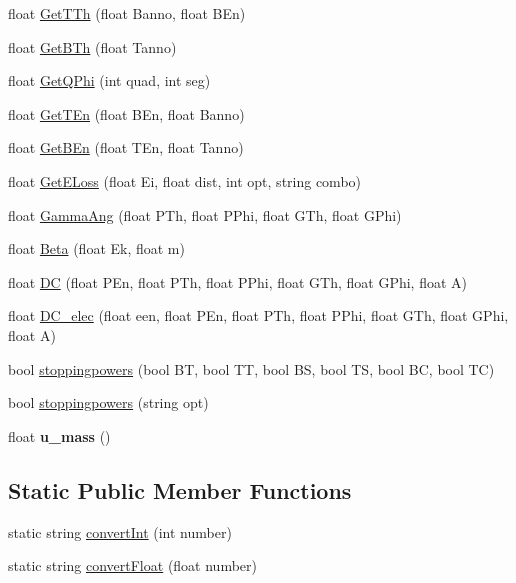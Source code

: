 \begin{DoxyCompactItemize}
float \hyperlink{classdoppler_a7865dcf92a6b18d23cb48e9e624e505b}{Get\-T\-Th} (float Banno, float B\-En)
\item 
float \hyperlink{classdoppler_ac834d80156ae80009b508ae41fedde3d}{Get\-B\-Th} (float Tanno)
\item 
float \hyperlink{classdoppler_a7c3afd05ed9ddb8c5bedc0de905acd0b}{Get\-Q\-Phi} (int quad, int seg)
\item 
float \hyperlink{classdoppler_a31a09afe8920dc1302162ec8e0be9302}{Get\-T\-En} (float B\-En, float Banno)
\item 
float \hyperlink{classdoppler_a182d987ddc6db4a8b8e7f7821bda3846}{Get\-B\-En} (float T\-En, float Tanno)
\item 
float \hyperlink{classdoppler_a64570ec784dabd6e17cf836489450527}{Get\-E\-Loss} (float Ei, float dist, int opt, string combo)
\item 
float \hyperlink{classdoppler_a6dca381f91f2267abefadd62cf66f69f}{Gamma\-Ang} (float P\-Th, float P\-Phi, float G\-Th, float G\-Phi)
\item 
float \hyperlink{classdoppler_a28eb084d224fdb58fda1d6f6c61dd232}{Beta} (float Ek, float m)
\item 
float \hyperlink{classdoppler_a7f08d93d2bfa269f8c22ac71b604b09a}{D\-C} (float P\-En, float P\-Th, float P\-Phi, float G\-Th, float G\-Phi, float A)
\item 
float \hyperlink{classdoppler_ad8387753c2288d464b64579a23d3bc4e}{D\-C\-\_\-elec} (float een, float P\-En, float P\-Th, float P\-Phi, float G\-Th, float G\-Phi, float A)
\item 
bool \hyperlink{classdoppler_a0ab0f803a7ab47bf2d087ee973ccdbc3}{stoppingpowers} (bool B\-T, bool T\-T, bool B\-S, bool T\-S, bool B\-C, bool T\-C)
\item 
bool \hyperlink{classdoppler_a4be762591578e28f8e9d646475ca943a}{stoppingpowers} (string opt)
\item 
\hypertarget{classdoppler_a68d168fdd3cb3edeb4a015aeaf0d3391}{float {\bfseries u\-\_\-mass} ()}\label{classdoppler_a68d168fdd3cb3edeb4a015aeaf0d3391}

\end{DoxyCompactItemize}
\subsection*{Static Public Member Functions}
\begin{DoxyCompactItemize}
\item 
static string \hyperlink{classdoppler_a100e363bf80b5371baebb89bbf60b824}{convert\-Int} (int number)
\item 
static string \hyperlink{classdoppler_a0fa8eec8989c81e59ecfb8e09140020c}{convert\-Float} (float number)
\end{DoxyCompactItemize}
